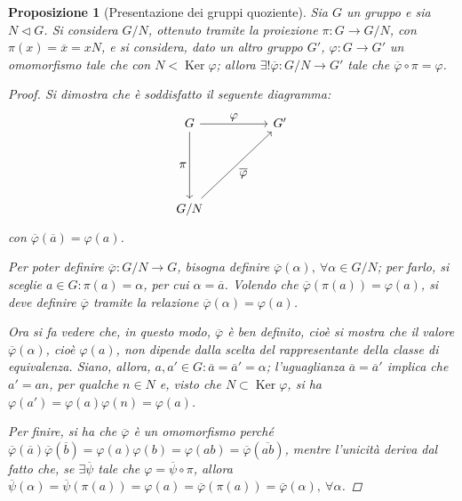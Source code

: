 \documentclass[12pt]{scrartcl}
\theoremstyle{style}
\newtheorem{prop}{Proposizione}[section]
\numberwithin{equation}{subsection}
\begin{document}
\begin{prop}
	[Presentazione dei gruppi quoziente]
	Sia $G$ un gruppo e sia $N \lhd G$. 
	Si considera $G / N$, ottenuto tramite la proiezione $\pi : G \to G / N$, con $\pi(x) = \overline{x}=x N$, e si considera, dato un altro gruppo $G'$, $\varphi :G \to G'$ un omomorfismo tale che con $N < \operatorname{Ker} \varphi $; allora $\exists ! \overline{\varphi }: G / N \to G '$ tale che $\overline{\varphi }\circ \pi = \varphi $.
\begin{proof}
	Si dimostra che \`e soddisfatto il seguente diagramma:
	\[
	\begin{tikzcd}
		G & & G '\\
		\\
		\\
		 G / N
		\arrow[from=1-1, to=1-3, "\displaystyle \varphi "]
		\arrow[from=1-1, to=4-1, "\displaystyle \pi"']
		\arrow[from=4-1, to=1-3, "\displaystyle \overline{\varphi}"']
	\end{tikzcd}
	\] 
	con $\overline{\varphi }(\overline{a}) = \varphi (a)$.

	Per poter definire $\overline{\varphi } : G / N \to G$, bisogna definire $\overline{\varphi }(\alpha ), \ \forall \alpha \in G / N$; per farlo, si sceglie $a \in G : \pi (a) = \alpha $, per cui $\alpha  = \overline{a}$. 
	Volendo che $\overline{\varphi }(\pi(a)) = \varphi (a)$, si deve definire $\overline{\varphi }$ tramite la relazione $\overline{\varphi }(\alpha ) = \varphi (a)$.

	Ora si fa vedere che, in questo modo, $\overline{\varphi }$ \`e ben definito, cio\`e si mostra che il valore $\overline{\varphi }(\alpha )$, cio\`e $\varphi (a)$, non dipende dalla scelta del rappresentante della classe di equivalenza.
	Siano, allora, $a,a' \in G : \overline{a}= \overline{a}' = \alpha $; l'uguaglianza $\overline{a}=\overline{a}'$ implica che $a' = an$, per qualche $n \in N$ e, visto che $N\subset\operatorname{Ker} \varphi $, si ha $\varphi (a')=\varphi (a)\varphi (n)=\varphi (a)$.

	Per finire, si ha che $\overline{\varphi }$ \`e un omomorfismo perch\'e $\overline{\varphi }(\overline{a})\overline{\varphi }(\overline{b}) = \varphi (a)\varphi (b) = \varphi (ab) = \overline{\varphi }(\overline{ab})$, mentre l'unicit\`a deriva dal fatto che, se $\exists \overline{\psi }$ tale che $\varphi = \overline{\psi }\circ\pi$, allora $\overline{\psi }(\alpha ) = \overline{\psi }(\pi(a)) = \varphi (a) = \overline{\varphi }(\pi(a))=\overline{\varphi }(\alpha ), \ \forall \alpha $.
\end{proof}
\end{prop}
\end{document}
